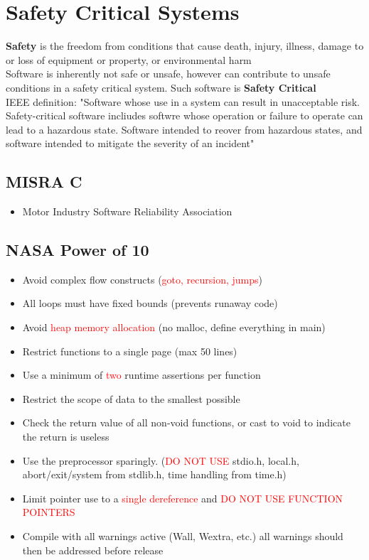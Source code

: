 \documentclass[oneside]{book}
\begin{document}
    \chapter{Safety Critical Systems}
        \textbf{Safety} is the freedom from conditions that cause death, injury, illness, damage
        to or loss of equipment or property, or environmental harm\\
        Software is inherently not safe or unsafe, however can contribute to unsafe conditions in a
        safety critical system. Such software is \textbf{Safety Critical}\\
        IEEE definition: "Software whose use in a system can result in unacceptable risk. Safety-critical
        software incliudes softwre whose operation or failure to operate can lead to a hazardous state.
        Software intended to reover from hazardous states, and software intended to mitigate the severity
        of an incident"
        \section{MISRA C}
            \begin{itemize}
                \item Motor Industry Software Reliability Association
            \end{itemize}
        \section{NASA Power of 10}
            \begin{itemize}
                \item Avoid complex flow constructs (\textcolor{red}{goto, recursion, jumps})
                \item All loops must have fixed bounds (prevents runaway code)
                \item Avoid \textcolor{red}{heap memory allocation} (no malloc, define everything in main)
                \item Restrict functions to a single page (max 50 lines)
                \item Use a minimum of \textcolor{red}{two} runtime assertions per function
                \item Restrict the scope of data to the smallest possible
                \item Check the return value of all non-void functions, or cast to void to indicate the return is useless
                \item Use the preprocessor sparingly. (\textcolor{red}{DO NOT USE} stdio.h, local.h, abort/exit/system from stdlib.h, time handling from time.h)
                \item Limit pointer use to a \textcolor{red}{single dereference} and \textcolor{red}{DO NOT USE FUNCTION POINTERS}
                \item Compile with all warnings active (Wall, Wextra, etc.) all warnings should then be addressed before release
            \end{itemize}
\end{document}
